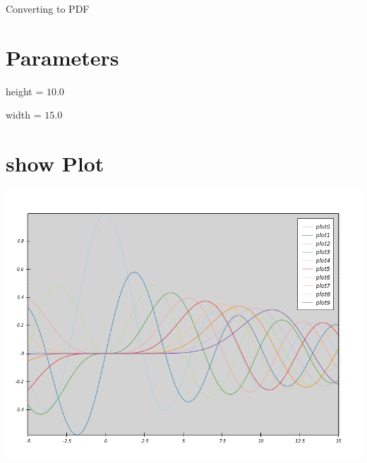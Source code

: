 \documentclass[paper=a4, fleqn]{scrartcl}
\begin{document}
\author{Faeze}

\begin{titlepage}

\begin{center}
Converting to PDF
\end{center}

\section{Parameters}

height = $10.0$

width = $15.0$

\section{show Plot}

\includegraphics[scale=0.6]{noninteractive.png}

\end{titlepage}
\end{document}
